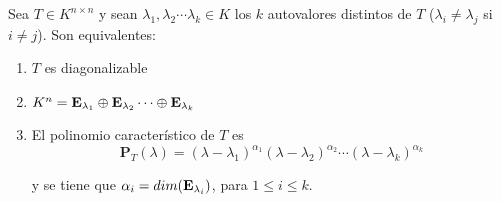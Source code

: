 \begin{theorem}

\label{PROPOSICIÓN 622:}
Sea $T  \in K^{n \times n}$ y sean $\lambda_1,\lambda_2  \cdots \lambda_k   \in K$ los $k$ autovalores distintos   de $T$ ($\lambda_i \neq \lambda_j$ si $i \neq j$). Son equivalentes:




\begin{enumerate}


\item $T$ es diagonalizable

\item $K^{n}=\bold E_{\lambda_1} \oplus \bold E_{\lambda_2}\cdots  \oplus \bold E_{\lambda_k}$

\item El polinomio característico de $T$ es 
$$   \mathbf{P}_T(\lambda)=(\lambda-\lambda_1)^{\alpha_1}(\lambda-\lambda_2)^{\alpha_2}\cdots(\lambda-\lambda_k)^{\alpha_k}$$ 

\noindent
y se tiene que $\alpha_i=dim(\bold E_{\lambda_i})$, para $1 \leq i \leq k$.

\end{enumerate}

\bigskip
\noindent



\end{theorem}



\bigskip


\bigskip


